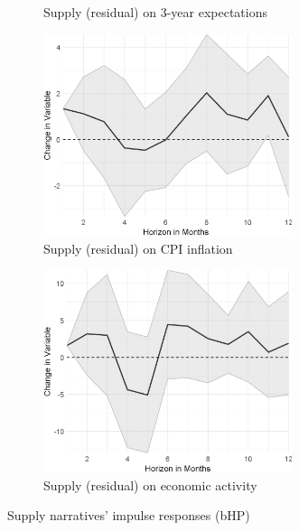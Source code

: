 \begin{figure}
\begin{subfigure}{00.24\textwidth}
		\caption{Supply (residual) on 3-year expectations}
	\end{subfigure}
	\begin{subfigure}{00.24\textwidth}
		\includegraphics[width=0.8\textwidth]{output/lp/baseline/bHP/supply/supplyoninflation_djn.eps}
		\caption{Supply (residual) on CPI inflation}
	\end{subfigure}
	\begin{subfigure}{00.24\textwidth}
		\includegraphics[width=0.8\textwidth]{output/lp/baseline/bHP/supply/supplyoneconac_djn.eps}
		\caption{Supply (residual) on economic activity}
	\end{subfigure}
	\caption{Supply narratives' impulse responses (bHP)}
	\label{fig:irf_2}
\end{figure}
